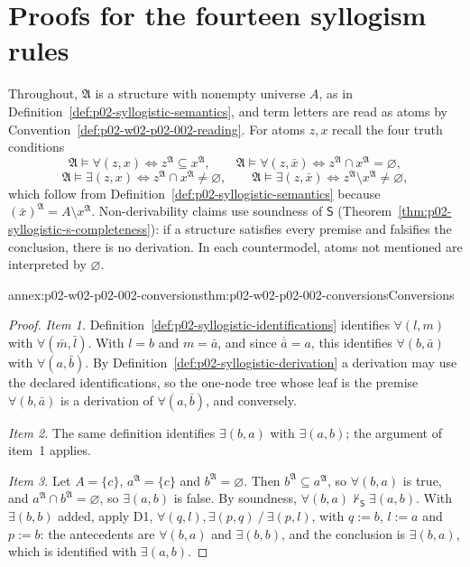 \section{Proofs for the fourteen syllogism rules}
\label{sec:annex-p02-w02-p02-002-fourteen}

Throughout, \(\mathfrak A\) is a structure with nonempty universe \(A\), as
in Definition~\ref{def:p02-syllogistic-semantics}, and term letters are read
as atoms by Convention~\ref{def:p02-w02-p02-002-reading}. For atoms \(z,x\)
recall the four truth conditions
\[
 \mathfrak A\models\forall(z,x)\iff z^{\mathfrak A}\subseteq x^{\mathfrak A},
 \qquad
 \mathfrak A\models\forall(z,\bar x)\iff z^{\mathfrak A}\cap x^{\mathfrak A}=\varnothing,
\]
\[
 \mathfrak A\models\exists(z,x)\iff z^{\mathfrak A}\cap x^{\mathfrak A}\ne\varnothing,
 \qquad
 \mathfrak A\models\exists(z,\bar x)\iff z^{\mathfrak A}\setminus x^{\mathfrak A}\ne\varnothing,
\]
which follow from Definition~\ref{def:p02-syllogistic-semantics} because
\((\bar x)^{\mathfrak A}=A\setminus x^{\mathfrak A}\). Non-derivability
claims use soundness of \(\mathsf S\)
(Theorem~\ref{thm:p02-syllogistic-s-completeness}): if a structure satisfies
every premise and falsifies the conclusion, there is no derivation. In each
countermodel, atoms not mentioned are interpreted by \(\varnothing\).

\begin{annexitem}{annex:p02-w02-p02-002-conversions}{thm:p02-w02-p02-002-conversions}{Conversions}
\begin{proof}
\emph{Item 1.} Definition~\ref{def:p02-syllogistic-identifications}
identifies \(\forall(l,m)\) with \(\forall(\bar m,\bar l)\). With \(l=b\) and
\(m=\bar a\), and since \(\overline{\bar a}=a\), this identifies
\(\forall(b,\bar a)\) with \(\forall(a,\bar b)\). By
Definition~\ref{def:p02-syllogistic-derivation} a derivation may use the
declared identifications, so the one-node tree whose leaf is the premise
\(\forall(b,\bar a)\) is a derivation of \(\forall(a,\bar b)\), and
conversely.

\emph{Item 2.} The same definition identifies \(\exists(b,a)\) with
\(\exists(a,b)\); the argument of item~1 applies.

\emph{Item 3.} Let \(A=\{c\}\), \(a^{\mathfrak A}=\{c\}\) and
\(b^{\mathfrak A}=\varnothing\). Then \(b^{\mathfrak A}\subseteq
a^{\mathfrak A}\), so \(\forall(b,a)\) is true, and
\(a^{\mathfrak A}\cap b^{\mathfrak A}=\varnothing\), so \(\exists(a,b)\) is
false. By soundness, \(\forall(b,a)\nvdash_{\mathsf S}\exists(a,b)\).
With \(\exists(b,b)\) added, apply D1,
\(\forall(q,l),\exists(p,q)\mathbin{/}\exists(p,l)\), with \(q:=b\),
\(l:=a\) and \(p:=b\): the antecedents are \(\forall(b,a)\) and
\(\exists(b,b)\), and the conclusion is \(\exists(b,a)\), which is
identified with \(\exists(a,b)\).
\end{proof}
\end{annexitem}

